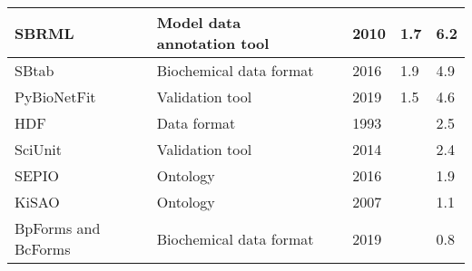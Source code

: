 \begin{longtable}{ |L{2.2cm}|L{5cm}|L{1.2cm}|L{1cm}|R{1.2cm}|R{1cm}| }
\hline
\small{SBRML} &\small{Model data annotation tool} &\cite{Dada2010SBRML:Models} &\small{2010} &\small{1.7} &\small{6.2}\\
\hline
\small{SBtab} &\small{Biochemical data format} &\cite{Lubitz2016SBtab:Biology} &\small{2016} &\small{1.9} &\small{4.9}\\
\hline
\small{PyBioNetFit} &\small{Validation tool} &\cite{Mitra2019PyBioNetFitLanguage} &\small{2019} &\small{1.5} &\small{4.6}\\
\hline
\small{HDF} &\small{Data format} &\cite{Brown1993SoftwareManagement} &\small{1993} &\small{} &\small{2.5}\\
\hline
\small{SciUnit} &\small{Validation tool} &\cite{Omar2014CollaborativeValidation} &\small{2014} &\small{} &\small{2.4}\\
\hline
\small{SEPIO} &\small{Ontology} &\cite{Brush2016SEPIO:Evidence} &\small{2016} &\small{} &\small{1.9}\\
\hline
\small{KiSAO} &\small{Ontology} &\cite{Zhukova2011KineticOntology} &\small{2007} &\small{} &\small{1.1}\\
\hline
\small{BpForms and BcForms} &\small{Biochemical data format} &\cite{Lang2019BpForms:Proteins} &\small{2019} &\small{} &\small{0.8}\\
\hline
\end{longtable}
